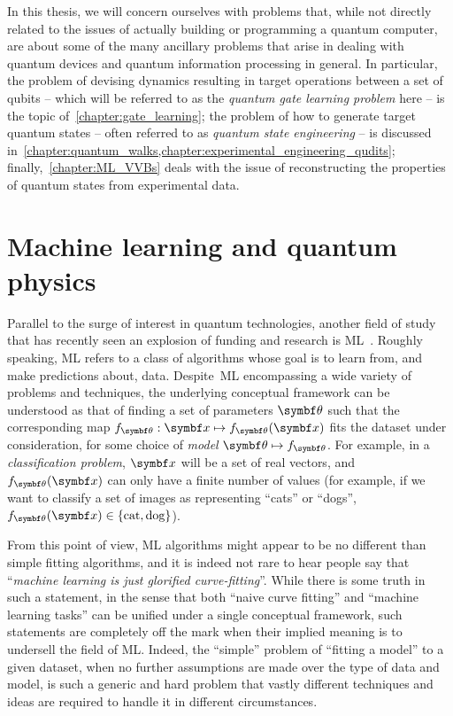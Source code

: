 In this thesis, we will concern ourselves with problems that, while not directly related to the issues of actually building or programming a quantum computer, are about some of the many ancillary problems that arise in dealing with quantum devices and quantum information processing in general.
In particular, the problem of devising dynamics resulting in target operations between a set of qubits -- which will be referred to as the \emph{quantum gate learning problem} here -- is the topic of~\cref{chapter:gate_learning}; the problem of how to generate target quantum states -- often referred to as \emph{quantum state engineering} -- is discussed in~\cref{chapter:quantum_walks,chapter:experimental_engineering_qudits}; finally,~\cref{chapter:ML_VVBs} deals with the issue of reconstructing the properties of quantum states from experimental data.

\section{Machine learning and quantum physics}
\label{sec:intro:ML}

Parallel to the surge of interest in quantum technologies, another field of study that has recently seen an explosion of funding and research is \ac{ML}~\cite{friedman2001elements,you2011atomic,bishop2006pattern,abu2012learning,murphy2012machine,mehta2019highbias}.
Roughly speaking, \ac{ML} refers to a class of algorithms whose goal is to learn from, and make predictions about, data.
Despite~\ac{ML} encompassing a wide variety of problems and techniques, the underlying conceptual framework can be understood as that of finding a set of parameters $\bstheta$ such that the corresponding map $f_\bstheta:\bs x\mapsto f_\bstheta(\bs x)$ fits the dataset under consideration, for some choice of \emph{model} $\bstheta\mapsto f_\bstheta$.
For example, in a \emph{classification problem}, $\bs x$ will be a set of real vectors, and $f_\bstheta(\bs x)$ can only have a finite number of values (for example, if we want to classify a set of images as representing ``cats'' or ``dogs'', $f_\bstheta(\bs x)\in\{\text{cat},\text{dog}\}$).

From this point of view, \ac{ML} algorithms might appear to be no different than simple fitting algorithms, and it is indeed not rare to hear people say that ``\emph{machine learning is just glorified curve-fitting}''. While there is some truth in such a statement, in the sense that both ``naive curve fitting'' and ``machine learning tasks'' can be unified under a single conceptual framework, such statements are completely off the mark when their implied meaning is to undersell the field of \ac{ML}.
Indeed, the ``simple'' problem of ``fitting a model'' to a given dataset, when no further assumptions are made over the type of data and model, is such a generic and hard problem that vastly different techniques and ideas are required to handle it in different circumstances.

